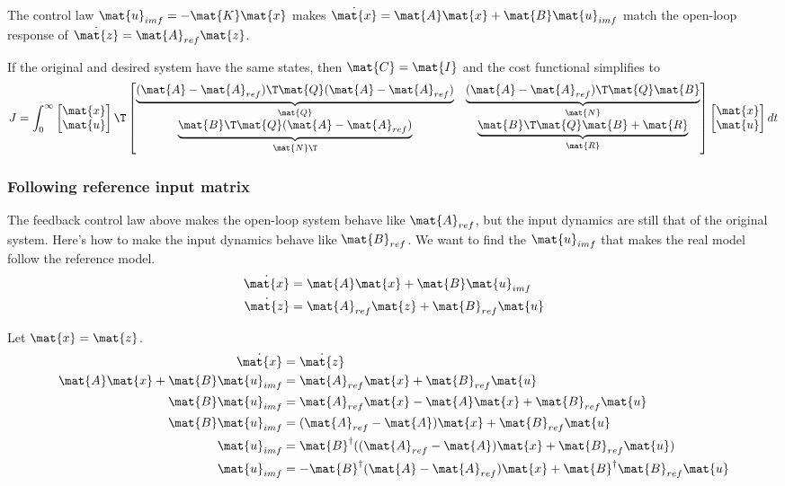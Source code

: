 The control law $\mat{u}_{imf} = -\mat{K}\mat{x}$ makes
$\dot{\mat{x}} = \mat{A}\mat{x} + \mat{B}\mat{u}_{imf}$ match the open-loop
response of $\dot{\mat{z}} = \mat{A}_{ref}\mat{z}$.

If the original and desired system have the same states, then
$\mat{C} = \mat{I}$ and the cost functional simplifies to
\begin{equation}
  J = \int_0^\infty
  \begin{bmatrix}
    \mat{x} \\
    \mat{u}
  \end{bmatrix}\T
  \begin{bmatrix}
    \underbrace{(\mat{A} - \mat{A}_{ref})\T\mat{Q}
      (\mat{A} - \mat{A}_{ref})}_{\mat{Q}} &
    \underbrace{(\mat{A} - \mat{A}_{ref})\T\mat{Q}\mat{B}}_{\mat{N}} \\
    \underbrace{\mat{B}\T\mat{Q}(\mat{A} - \mat{A}_{ref})}_{\mat{N}\T} &
    \underbrace{\mat{B}\T\mat{Q}\mat{B} + \mat{R}}_{\mat{R}}
  \end{bmatrix}
  \begin{bmatrix}
    \mat{x} \\
    \mat{u}
  \end{bmatrix}
  dt
\end{equation}

\subsubsection{Following reference input matrix}

The feedback control law above makes the open-loop system behave like
$\mat{A}_{ref}$, but the input dynamics are still that of the original system.
Here's how to make the input dynamics behave like $\mat{B}_{ref}$. We want to
find the $\mat{u}_{imf}$ that makes the real model follow the reference model.
\begin{align*}
  \dot{\mat{x}} &= \mat{A}\mat{x} + \mat{B}\mat{u}_{imf} \\
  \dot{\mat{z}} &= \mat{A}_{ref}\mat{z} + \mat{B}_{ref}\mat{u}
\end{align*}

Let $\mat{x} = \mat{z}$.
\begin{align*}
  \dot{\mat{x}} &= \dot{\mat{z}} \\
  \mat{A}\mat{x} + \mat{B}\mat{u}_{imf} &= \mat{A}_{ref}\mat{x} +
    \mat{B}_{ref}\mat{u} \\
  \mat{B}\mat{u}_{imf} &= \mat{A}_{ref}\mat{x} - \mat{A}\mat{x} +
    \mat{B}_{ref}\mat{u} \\
  \mat{B}\mat{u}_{imf} &= (\mat{A}_{ref} - \mat{A})\mat{x} +
    \mat{B}_{ref}\mat{u} \\
  \mat{u}_{imf} &= \mat{B}^\dagger ((\mat{A}_{ref} - \mat{A})\mat{x} +
    \mat{B}_{ref}\mat{u}) \\
  \mat{u}_{imf} &= -\mat{B}^\dagger (\mat{A} - \mat{A}_{ref})\mat{x} +
    \mat{B}^\dagger \mat{B}_{ref}\mat{u}
\end{align*}

